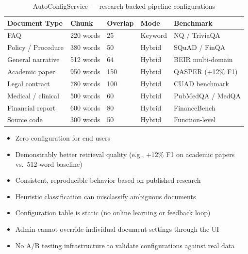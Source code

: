 \documentclass[12pt, a4paper, oneside]{report}
\begin{document}
\begin{table}[H]
\centering
\small
{}
\begin{tabularx}{\linewidth}{lXllX}
\toprule
\rowcolor{rapidblue!10}
\textbf{Document Type} & \textbf{Chunk} & \textbf{Overlap} & \textbf{Mode} & \textbf{Benchmark} \\
\midrule
FAQ & 220 words & 25 & Keyword & NQ / TriviaQA \\
Policy / Procedure & 380 words & 50 & Hybrid & SQuAD / FinQA \\
General narrative & 512 words & 64 & Hybrid & BEIR multi-domain \\
Academic paper & 950 words & 150 & Hybrid & QASPER (+12\% F1) \\
Legal contract & 780 words & 100 & Hybrid & CUAD benchmark \\
Medical / clinical & 500 words & 60 & Hybrid & PubMedQA / MedQA \\
Financial report & 600 words & 80 & Hybrid & FinanceBench \\
Source code & 300 words & 50 & Hybrid & Function-level \\
\bottomrule
\end{tabularx}
\caption{AutoConfigService — research-backed pipeline configurations}
\end{table}

\begin{probox}[Benefits]
\begin{itemize}
  \item Zero configuration for end users
  \item Demonstrably better retrieval quality (e.g., +12\% F1 on academic papers vs.\ 512-word baseline)
  \item Consistent, reproducible behavior based on published research
\end{itemize}
\end{probox}

\begin{conbox}[Drawbacks]
\begin{itemize}
  \item Heuristic classification can misclassify ambiguous documents
  \item Configuration table is static (no online learning or feedback loop)
  \item Admin cannot override individual document settings through the UI
  \item No A/B testing infrastructure to validate configurations against real data
\end{itemize}
\end{conbox}
\end{document}
